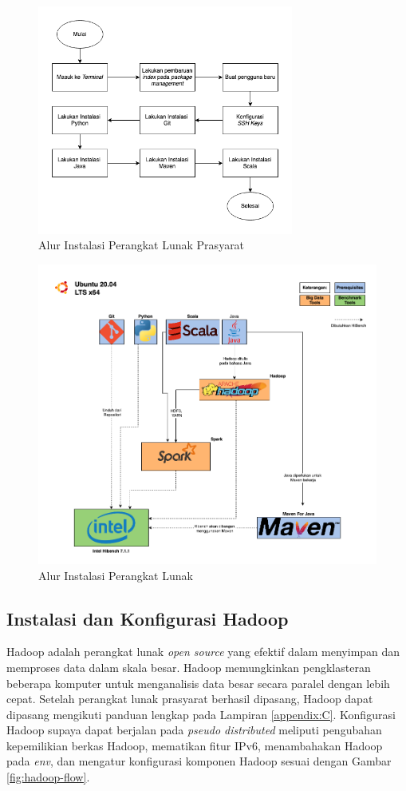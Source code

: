 \begin{figure}[h!]
    \centering
    \includegraphics[width=0.75\textwidth]{figures/ch03/prasayarat-flow.png}
    \caption{Alur Instalasi Perangkat Lunak Prasyarat}
    \label{fig:prasyarat-flow}
\end{figure}

\begin{landscape}
\begin{figure}
    \centering
    \includegraphics[height=0.6\linewidth]{figures/ch03/alurkerja-soft.png}
    \caption{Alur Instalasi Perangkat Lunak}
    \label{fig:alurkerja-soft}
\end{figure}
\end{landscape}

\subsection{Instalasi dan Konfigurasi Hadoop}
Hadoop adalah perangkat lunak \textit{open source} yang efektif dalam menyimpan dan memproses data dalam skala besar. Hadoop memungkinkan pengklasteran beberapa komputer untuk menganalisis  data besar secara paralel dengan lebih cepat. Setelah perangkat lunak prasyarat berhasil dipasang, Hadoop dapat dipasang mengikuti panduan lengkap pada Lampiran \ref{appendix:C}. Konfigurasi Hadoop supaya dapat berjalan pada \textit{pseudo distributed} meliputi pengubahan kepemilikian berkas Hadoop, mematikan fitur IPv6, menambahakan Hadoop pada \textit{env}, dan mengatur konfigurasi komponen Hadoop sesuai dengan Gambar \ref{fig:hadoop-flow}.

